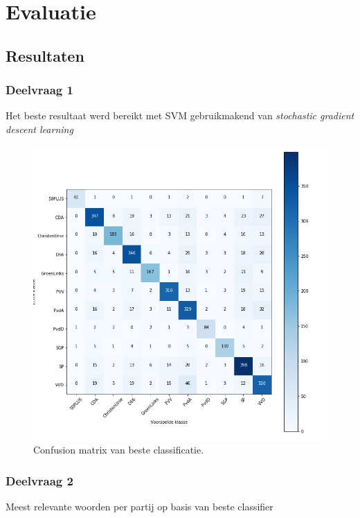 \section{Evaluatie}
\label{sec:eva}

\subsection{Resultaten}

\subsubsection{Deelvraag 1}
Het beste resultaat werd bereikt met SVM gebruikmakend van \textit{stochastic gradient descent learning}

\begin{figure}
  \caption{Confusion matrix van beste classificatie.}
  \centering
    \includegraphics[width=0.6\paperwidth]{Verslag/confusionmatrix.png}
\end{figure}

\subsubsection{Deelvraag 2}
\begin{table}[H]
\label{aantallen}
\caption{Meest relevante woorden per partij op basis van beste classifier}
\centering

\end{table}


